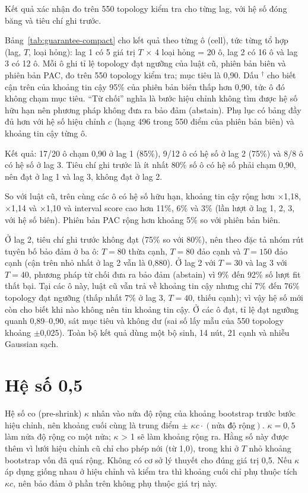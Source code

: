 \documentclass[11pt,a4paper]{article}
\begin{document}
Kết quả xác nhận đo trên 550 topology kiểm tra cho từng lag, với hệ số đóng băng và tiêu chí ghi trước.

Bảng~\ref{tab:guarantee-compact} cho kết quả theo từng ô (cell), tức từng tổ hợp (lag, $T$, loại hỏng): lag 1 có 5 giá trị $T$ $\times$ 4 loại hỏng = 20 ô, lag 2 có 16 ô và lag 3 có 12 ô. Mỗi ô ghi tỉ lệ topology đạt ngưỡng của luật cũ, phiên bản biên và phiên bản PAC, đo trên 550 topology kiểm tra; mục tiêu là 0,90. Dấu $^{\dagger}$ cho biết cận trên của khoảng tin cậy 95\% của phiên bản biên thấp hơn 0,90, tức ô đó không chạm mục tiêu. ``Từ chối'' nghĩa là bước hiệu chỉnh không tìm được hệ số hữu hạn nên phương pháp không đưa ra bảo đảm (abstain). Phụ lục có bảng đầy đủ hơn với hệ số hiệu chỉnh $c$ (hạng 496 trong 550 điểm của phiên bản biên) và khoảng tin cậy từng ô.



Kết quả: 17/20 ô chạm 0,90 ở lag 1 (85\%), 9/12 ô có hệ số ở lag 2 (75\%) và 8/8 ô có hệ số ở lag 3. Tiêu chí ghi trước là ít nhất 80\% số ô có hệ số phải chạm 0,90, nên đạt ở lag 1 và lag 3, không đạt ở lag 2.

So với luật cũ, trên cùng các ô có hệ số hữu hạn, khoảng tin cậy rộng hơn $\times$1,18, $\times$1,14 và $\times$1,10 và interval score cao hơn 11\%, 6\% và 3\% (lần lượt ở lag 1, 2, 3, với hệ số biên). Phiên bản PAC rộng hơn khoảng 5\% so với phiên bản biên.

Ở lag 2, tiêu chí ghi trước không đạt (75\% so với 80\%), nên theo đặc tả nhóm rút tuyên bố bảo đảm ở ba ô: $T=80$ thừa cạnh, $T=80$ đảo cạnh và $T=150$ đảo cạnh (cận trên nhỏ nhất ở lag 2 vẫn là 0,880). Ở lag 2 với $T=30$ và lag 3 với $T=40$, phương pháp từ chối đưa ra bảo đảm (abstain) vì 9\% đến 92\% số lượt fit thất bại. Tại các ô này, luật cũ vẫn trả về khoảng tin cậy nhưng chỉ 7\% đến 76\% topology đạt ngưỡng (thấp nhất 7\% ở lag 3, $T=40$, thiếu cạnh); vì vậy hệ số mới còn cho biết khi nào không nên tin khoảng tin cậy. Ở các ô đạt, tỉ lệ đạt ngưỡng quanh 0,89--0,90, sát mục tiêu và không dư (sai số lấy mẫu của 550 topology khoảng $\pm$0,025). Toàn bộ kết quả dùng một bộ sinh, 14 nút, 21 cạnh và nhiễu Gaussian sạch.

\section{Hệ số 0,5}

Hệ số co (pre-shrink) $\kappa$ nhân vào nửa độ rộng của khoảng bootstrap trước bước hiệu chỉnh, nên khoảng cuối cùng là trung điểm $\pm$ $\kappa c\cdot(\text{nửa độ rộng})$. $\kappa=0{,}5$ làm nửa độ rộng co một nửa; $\kappa$ \textgreater{} 1 sẽ làm khoảng rộng ra. Hằng số này được thêm vì lưới hiệu chỉnh cũ chỉ cho phép nới (từ 1,0), trong khi ở $T$ nhỏ khoảng bootstrap vốn đã quá rộng. Không có cơ sở lý thuyết cho đúng giá trị 0,5. Nếu $\kappa$ áp dụng giống nhau ở hiệu chỉnh và kiểm tra thì khoảng cuối chỉ phụ thuộc tích $\kappa c$, nên bảo đảm ở phần trên không phụ thuộc giá trị này.
\end{document}
